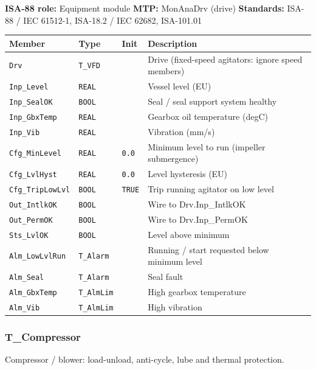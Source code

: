 {\small\textbf{ISA-88 role:} Equipment module \quad \textbf{MTP:} MonAnaDrv (drive) \quad \textbf{Standards:} ISA-88 /\allowbreak{} IEC 61512-1, ISA-18.2 /\allowbreak{} IEC 62682, ISA-101.01}
{\footnotesize
\begin{longtable}{@{}>{\raggedright\arraybackslash}p{3.4cm}>{\raggedright\arraybackslash}p{3.3cm}>{\raggedright\arraybackslash}p{1.3cm}>{\raggedright\arraybackslash}p{6.4cm}@{}}
\toprule
\rowcolor{tblhead}\textbf{Member} & \textbf{Type} & \textbf{Init} & \textbf{Description} \\
\midrule
\endhead
\texttt{Drv} & \texttt{T\_VFD} &  & Drive (fixed-speed agitators: ignore speed members) \\
\texttt{Inp\_Level} & \texttt{REAL} &  & Vessel level (EU) \\
\texttt{Inp\_SealOK} & \texttt{BOOL} &  & Seal /\allowbreak{} seal support system healthy \\
\texttt{Inp\_GbxTemp} & \texttt{REAL} &  & Gearbox oil temperature (degC) \\
\texttt{Inp\_Vib} & \texttt{REAL} &  & Vibration (mm/\allowbreak{}s) \\
\texttt{Cfg\_MinLevel} & \texttt{REAL} & \texttt{0.0} & Minimum level to run (impeller submergence) \\
\texttt{Cfg\_LvlHyst} & \texttt{REAL} & \texttt{0.0} & Level hysteresis (EU) \\
\texttt{Cfg\_TripLowLvl} & \texttt{BOOL} & \texttt{TRUE} & Trip running agitator on low level \\
\texttt{Out\_IntlkOK} & \texttt{BOOL} &  & Wire to Drv.Inp\_IntlkOK \\
\texttt{Out\_PermOK} & \texttt{BOOL} &  & Wire to Drv.Inp\_PermOK \\
\texttt{Sts\_LvlOK} & \texttt{BOOL} &  & Level above minimum \\
\texttt{Alm\_LowLvlRun} & \texttt{T\_Alarm} &  & Running /\allowbreak{} start requested below minimum level \\
\texttt{Alm\_Seal} & \texttt{T\_Alarm} &  & Seal fault \\
\texttt{Alm\_GbxTemp} & \texttt{T\_AlmLim} &  & High gearbox temperature \\
\texttt{Alm\_Vib} & \texttt{T\_AlmLim} &  & High vibration \\
\bottomrule
\end{longtable}
}
\subsubsection*{T\_Compressor}
\label{app:pclib:tcompressor}
Compressor /\allowbreak{} blower: load-unload, anti-cycle, lube and thermal protection.

